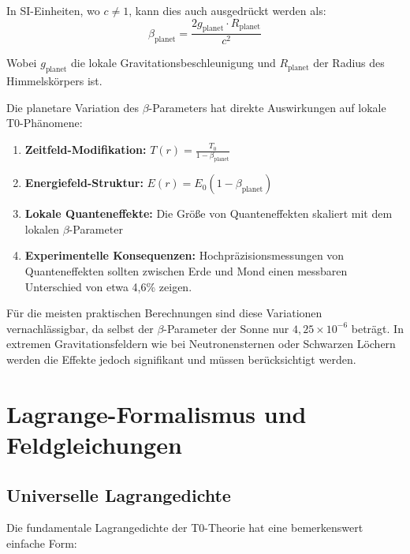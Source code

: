 \documentclass[12pt,a4paper]{article}
\theoremstyle{definition}
\begin{document}
	In SI-Einheiten, wo $c \neq 1$, kann dies auch ausgedrückt werden als:
	\begin{equation}
		\beta_{\text{planet}} = \frac{2g_{\text{planet}} \cdot R_{\text{planet}}}{c^2}
	\end{equation}
	
	Wobei $g_{\text{planet}}$ die lokale Gravitationsbeschleunigung und $R_{\text{planet}}$ der Radius des Himmelskörpers ist.
	
	
	
	\begin{wichtig}
		Die planetare Variation des $\beta$-Parameters hat direkte Auswirkungen auf lokale T0-Phänomene:
		
		\begin{enumerate}
			\item \textbf{Zeitfeld-Modifikation:} $T(r) = \frac{T_0}{1 - \beta_{\text{planet}}}$
			
			\item \textbf{Energiefeld-Struktur:} $E(r) = E_0(1 - \beta_{\text{planet}})$
			
			\item \textbf{Lokale Quanteneffekte:} Die Größe von Quanteneffekten skaliert mit dem lokalen $\beta$-Parameter
			
			\item \textbf{Experimentelle Konsequenzen:} Hochpräzisionsmessungen von Quanteneffekten sollten zwischen Erde und Mond einen messbaren Unterschied von etwa 4,6\% zeigen.
		\end{enumerate}
		
		Für die meisten praktischen Berechnungen sind diese Variationen vernachlässigbar, da selbst der $\beta$-Parameter der Sonne nur $4,25 \times 10^{-6}$ beträgt. In extremen Gravitationsfeldern wie bei Neutronensternen oder Schwarzen Löchern werden die Effekte jedoch signifikant und müssen berücksichtigt werden.
	\end{wichtig}
	
	\section{Lagrange-Formalismus und Feldgleichungen}
	
	\subsection{Universelle Lagrangedichte}
	
	Die fundamentale Lagrangedichte der T0-Theorie hat eine bemerkenswert einfache Form:
	
\end{document}
